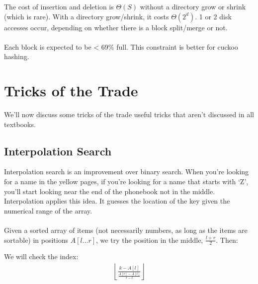\documentclass[]{article}
\theoremstyle{definition}
\begin{document}
			The cost of insertion and deletion is $\Theta(S)$ without a directory grow or shrink (which is rare). With a directory grow/shrink, it costs $\Theta(2^d)$. 1 or 2 disk accesses occur, depending on whether there is a block split/merge or not.
			\\ \\
			Each block is expected to be < 69\% full. This constraint is better for cuckoo hashing.
	
	\section{Tricks of the Trade}
		We'll now discuss some tricks of the trade \textendash{} useful tricks that aren't discussed in all textbooks.

		\subsection{Interpolation Search}
			Interpolation search is an improvement over binary search. When you're looking for a name in the yellow pages, if you're looking for a name that starts with `Z', you'll start looking near the end of the phonebook \textendash{} not in the middle. Interpolation applies this idea. It guesses the location of the key given the numerical range of the array.
			\\ \\
			Given a sorted array of items (not necessarily numbers, as long as the items are sortable) in positions $A[l \ldots r]$, we try the position in the middle, $\frac{l + r}{2}$. Then: \\
			\begin{algorithm}[H]
			\end{algorithm}

			We will check the index:
			\begin{align*}
				\left \lfloor \frac{k - A[l]}{\frac{A[r] - A[l]}{r - l}} \right \rfloor
			\end{align*}
\end{document}
